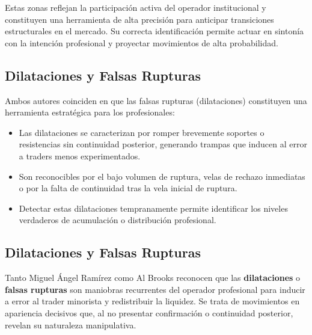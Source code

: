 \noindent
Estas zonas reflejan la participaci\'on activa del operador institucional y constituyen una herramienta de alta precisi\'on para anticipar transiciones estructurales en el mercado. Su correcta identificaci\'on permite actuar en sinton\'ia con la intenci\'on profesional y proyectar movimientos de alta probabilidad.



\subsection{Dilataciones y Falsas Rupturas}

Ambos autores coinciden en que las falsas rupturas (dilataciones) constituyen una herramienta estrat\'egica para los profesionales:

\begin{itemize}
    \item Las dilataciones se caracterizan por romper brevemente soportes o resistencias sin continuidad posterior, generando trampas que inducen al error a traders menos experimentados.
    
    \item Son reconocibles por el bajo volumen de ruptura, velas de rechazo inmediatas o por la falta de continuidad tras la vela inicial de ruptura.
    
    \item Detectar estas dilataciones tempranamente permite identificar los niveles verdaderos de acumulaci\'on o distribuci\'on profesional.
\end{itemize}


\subsection{Dilataciones y Falsas Rupturas}

Tanto Miguel \'Angel Ram\'irez como Al Brooks reconocen que las \textbf{dilataciones} o \textbf{falsas rupturas} son maniobras recurrentes del operador profesional para inducir a error al trader minorista y redistribuir la liquidez. Se trata de movimientos en apariencia decisivos que, al no presentar confirmaci\'on o continuidad posterior, revelan su naturaleza manipulativa.

